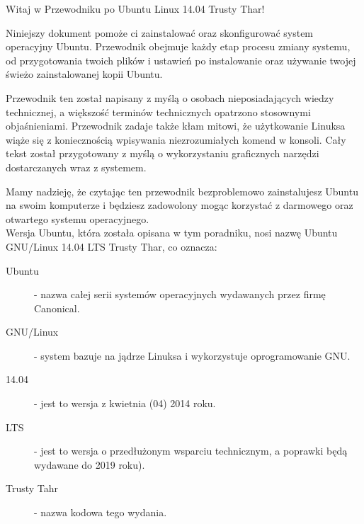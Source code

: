 \noindent Witaj w \textcolor{ubuntu_orange}{Przewodniku po Ubuntu Linux 14.04 Trusty Thar!}

Niniejszy dokument pomoże ci zainstalować oraz skonfigurować system operacyjny Ubuntu. Przewodnik obejmuje każdy etap procesu zmiany systemu, od przygotowania twoich plików i ustawień po instalowanie oraz używanie twojej świeżo zainstalowanej kopii Ubuntu.

Przewodnik ten został napisany z myślą o osobach nieposiadających wiedzy technicznej, a większość terminów technicznych opatrzono stosownymi objaśnieniami. Przewodnik zadaje także kłam mitowi, że użytkowanie Linuksa wiąże się z koniecznością wpisywania niezrozumiałych komend w konsoli. Cały tekst został przygotowany z myślą o wykorzystaniu graficznych narzędzi dostarczanych wraz z systemem.

Mamy nadzieję, że czytając ten przewodnik bezproblemowo zainstalujesz Ubuntu na swoim komputerze i będziesz zadowolony mogąc korzystać z darmowego oraz otwartego systemu operacyjnego.\\
Wersja Ubuntu, która została opisana w tym poradniku, nosi nazwę Ubuntu GNU/Linux 14.04 LTS Trusty Thar, co oznacza:
\begin{description}
\item[Ubuntu] -  nazwa całej serii systemów operacyjnych wydawanych przez firmę Canonical.
\item[GNU/Linux] - system bazuje na jądrze Linuksa i wykorzystuje oprogramowanie GNU.
\item[14.04] - jest to wersja z kwietnia (04) 2014 roku.
\item[LTS] - jest to wersja o przedłużonym wsparciu technicznym, a poprawki będą wydawane do 2019 roku).
\item[Trusty Tahr] - nazwa kodowa tego wydania.
\end{description}
\clearpage
